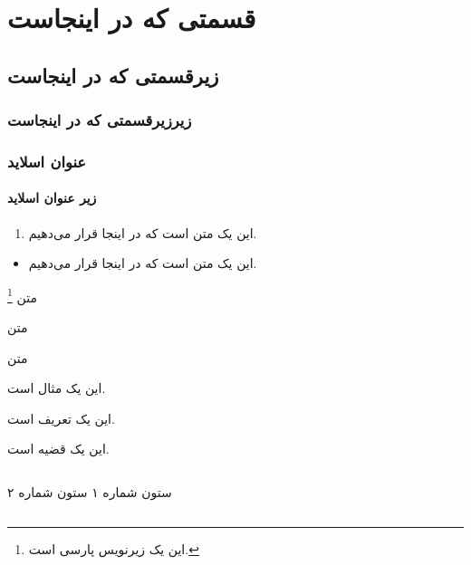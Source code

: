 \section{قسمتی که در اینجاست\hfill}
\subsection{زیرقسمتی که در اینجاست}
\subsubsection{زیرزیرقسمتی که در اینجاست}
\begin{frame}
\tableofcontents
\end{frame}

\begin{frame}
\frametitle{عنوان اسلاید}
\framesubtitle{زیر عنوان اسلاید}
\end{frame}

\begin{frame}
\begin{enumerate}
\item 
این یک متن است که در اینجا قرار می‌دهیم.
\end{enumerate}

\begin{itemize}
\item 
این یک متن است که در اینجا قرار می‌دهیم.
\end{itemize}
\end{frame}


\begin{frame}
متن%
\footnote{این یک زیرنویس پارسی است.}%

متن%
 
متن%

\end{frame}

\begin{frame}
\ptext[1]
\begin{example}
این یک مثال است.
\end{example}

\begin{definition}
این یک تعریف است.
\end{definition}

\begin{theorem}
این یک قضیه است.
\end{theorem}
\end{frame}


\begin{frame}
    \begin{columns} 
    ستون شماره ۱
    ستون شماره ۲
    \end{columns}
    \end{frame}


